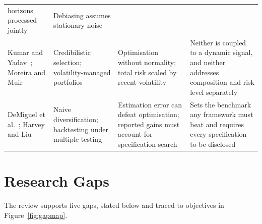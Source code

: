 \begin{table}[!htb]
\begin{tabular}{@{}L{2.35cm}L{3.5cm}L{3.9cm}L{4.3cm}@{}}
horizons processed jointly & Debiasing assumes stationary noise \\
Kumar and Yadav~\cite{kumar2024rdmdea}; Moreira and Muir~\cite{moreira2017} & Credibilistic
selection; volatility-managed portfolios & Optimisation without normality; total risk scaled by
recent volatility & Neither is coupled to a dynamic signal, and neither addresses composition
and risk level separately \\
DeMiguel et al.~\cite{demiguel2009}; Harvey and Liu~\cite{harvey2015} & Naive
diversification; backtesting under multiple testing & Estimation error can defeat
optimisation; reported gains must account for specification search & Sets the benchmark any
framework must beat and requires every specification to be disclosed \\
\bottomrule
\end{tabular}
\end{table}

\section{Research Gaps}

The review supports five gaps, stated below and traced to objectives in
Figure~\ref{fig:gapmap}.

